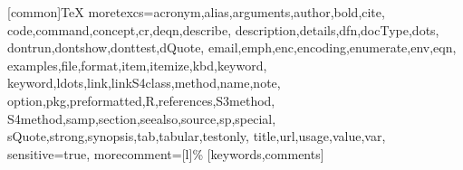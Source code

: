 %
\RequirePackage{color}
[common]{TeX}%
  {moretexcs={acronym,alias,arguments,author,bold,cite,%
          code,command,concept,cr,deqn,describe,%
          description,details,dfn,docType,dots,%
          dontrun,dontshow,donttest,dQuote,%
          email,emph,enc,encoding,enumerate,env,eqn,%
          examples,file,format,item,itemize,kbd,keyword,%
          keyword,ldots,link,linkS4class,method,name,note,%
          option,pkg,preformatted,R,references,S3method,%
          S4method,samp,section,seealso,source,sp,special,%
          sQuote,strong,synopsis,tab,tabular,testonly,%
          title,url,usage,value,var},
   sensitive=true,%
   morecomment=[l]\%%
}[keywords,comments]%
%
%
\global\def\Rlstset{\lstset{style=Rstyle}}%
\global\def\Rdlstset{\lstset{style=Rdstyle}}%
\Rlstset
%
